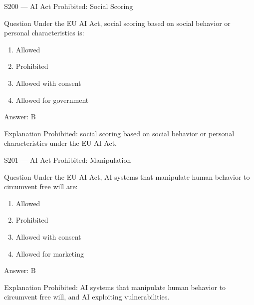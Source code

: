 \documentclass[aspectratio=169,8pt]{beamer}
\begin{document}
\begin{frame}{S200 --- AI Act Prohibited: Social Scoring}
	\begin{block}{Question}
		Under the EU AI Act, social scoring based on social behavior or personal characteristics is:
		\begin{enumerate}
			\item Allowed
			\item Prohibited
			\item Allowed with consent
			\item Allowed for government
		\end{enumerate}
	\end{block}
	\begin{exampleblock}{Answer: B}\end{exampleblock}
	\begin{block}{Explanation}
		Prohibited: social scoring based on social behavior or personal characteristics under the EU AI Act.
	\end{block}
\end{frame}

\begin{frame}{S201 --- AI Act Prohibited: Manipulation}
	\begin{block}{Question}
		Under the EU AI Act, AI systems that manipulate human behavior to circumvent free will are:
		\begin{enumerate}
			\item Allowed
			\item Prohibited
			\item Allowed with consent
			\item Allowed for marketing
		\end{enumerate}
	\end{block}
	\begin{exampleblock}{Answer: B}\end{exampleblock}
	\begin{block}{Explanation}
		Prohibited: AI systems that manipulate human behavior to circumvent free will, and AI exploiting vulnerabilities.
	\end{block}
\end{frame}
\end{document}
